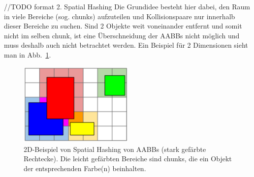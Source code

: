 //TODO format
2. Spatial Hashing
Die Grundidee besteht hier dabei, den Raum in viele Bereiche (sog. chunks) aufzuteilen und Kollisionspaare nur innerhalb dieser Bereiche zu suchen. Sind 2 Objekte weit voneinander entfernt und somit nicht im selben chunk, ist eine Überschneidung der AABBs nicht möglich und muss deshalb auch nicht betrachtet werden. Ein Beispiel für 2 Dimensionen sieht man in Abb.~\ref{fig:spatialHashing}.

\begin{figure}
    \centering
    \includegraphics[width=0.5\textwidth]{./res/spatialHashingAABB.png}
    \caption{2D-Beispiel von Spatial Hashing von AABBs (stark gefärbte Rechtecke). Die leicht gefärbten Bereiche sind chunks, die ein Objekt der entsprechenden Farbe(n) beinhalten.}
    \label{fig:spatialHashing}
\end{figure}

